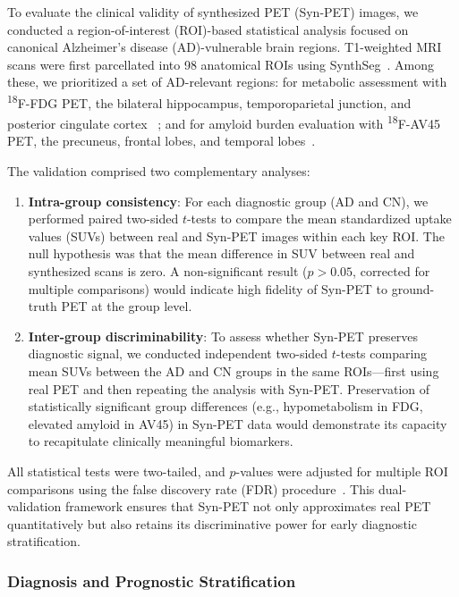 \documentclass{article}
\begin{document}
To evaluate the clinical validity of synthesized PET (Syn-PET) images, we conducted a region-of-interest (ROI)-based statistical analysis focused on canonical Alzheimer’s disease (AD)-vulnerable brain regions. T1-weighted MRI scans were first parcellated into 98 anatomical ROIs using SynthSeg~\cite{synthseg}. Among these, we prioritized a set of AD-relevant regions: for metabolic assessment with \textsuperscript{18}F-FDG PET, the bilateral hippocampus, temporoparietal junction, and posterior cingulate cortex ~\cite{mueller2005alzheimers}; and for amyloid burden evaluation with \textsuperscript{18}F-AV45 PET, the precuneus, frontal lobes, and temporal lobes~\cite{wong2010in}.

The validation comprised two complementary analyses:

\begin{enumerate}
    \item \textbf{Intra-group consistency}: For each diagnostic group (AD and CN), we performed paired two-sided $t$-tests to compare the mean standardized uptake values (SUVs) between real and Syn-PET images within each key ROI. The null hypothesis was that the mean difference in SUV between real and synthesized scans is zero. A non-significant result ($p > 0.05$, corrected for multiple comparisons) would indicate high fidelity of Syn-PET to ground-truth PET at the group level.

    \item \textbf{Inter-group discriminability}: To assess whether Syn-PET preserves diagnostic signal, we conducted independent two-sided $t$-tests comparing mean SUVs between the AD and CN groups in the same ROIs—first using real PET and then repeating the analysis with Syn-PET. Preservation of statistically significant group differences (e.g., hypometabolism in FDG, elevated amyloid in AV45) in Syn-PET data would demonstrate its capacity to recapitulate clinically meaningful biomarkers.
\end{enumerate}

All statistical tests were two-tailed, and $p$-values were adjusted for multiple ROI comparisons using the false discovery rate (FDR) procedure~\cite{benjamini1995controlling}. This dual-validation framework ensures that Syn-PET not only approximates real PET quantitatively but also retains its discriminative power for early diagnostic stratification.

\subsubsection{Diagnosis and Prognostic Stratification}
\end{document}
